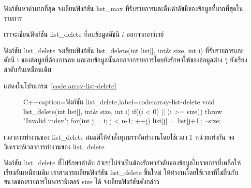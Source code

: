 \begin{quiz}{ฟังก์ชัน{\wbr}หา{\wbr}ค่า{\wbr}มาก{\wbr}ที่สุด}
จง{\wbr}เขียน{\wbr}ฟังก์ชัน {\ct list\_max} ที่{\wbr}รับ{\wbr}รายการ{\wbr}และ{\wbr}คืน{\wbr}ค่า{\wbr}ดัชนี{\wbr}ของ{\wbr}ข้อมูล{\wbr}ที่{\wbr}มาก{\wbr}ที่สุด{\wbr}ใน{\wbr}รายการ{\wbr}
\end{quiz}

เรา{\wbr}จะ{\wbr}เขียน{\wbr}ฟังก์ชัน {\ct list\_delete} ที่{\wbr}ลบ{\wbr}ข้อมูล{\wbr}ดัชนี $i$ ออก{\wbr}จาก{\wbr}อาร์เรย์  

\begin{quiz}{ฟังก์ชัน {\ct list\_delete}}
จง{\wbr}เขียน{\wbr}ฟังก์ชัน {\ct list\_delete(int list[], int\& size, int i)}
ที่{\wbr}รับ{\wbr}รายการ{\wbr}และ{\wbr}ดัชนี {\ct i} ของ{\wbr}ข้อมูล{\wbr}ที่{\wbr}ต้องการ{\wbr}ลบ{\wbr}
และ{\wbr}ลบ{\wbr}ข้อมูล{\wbr}นั้น{\wbr}ออก{\wbr}จาก{\wbr}รายการ{\wbr}โดย{\wbr}ยัง{\wbr}รักษา{\wbr}ให้{\wbr}ของ{\wbr}ข้อมูล{\wbr}ต่าง ๆ ยัง{\wbr}เรียงลำดับ{\wbr}กัน{\wbr}เหมือน{\wbr}เดิม{\wbr}
\end{quiz}
\begin{quizans}
แสดง{\wbr}ใน{\wbr}โปรแกรม~\ref{code:array-list-delete}
\end{quizans}

\begin{figure}
\latintext
\begin{codelist}{C++}{caption={\thaitext ฟังก์ชัน {\ct list\_delete}\latintext},label=code:array-list-delete}
void list_delete(int list[], int& size, int i)
{
  if((i < 0) || (i >= size))
    throw "Invalid index";
  for(int j = i; j < n-1; ++j)
    list[j] = list[j+1];
  --size;
}
\end{codelist}
\thaitext
\end{figure}

\begin{quiz}{เวลา{\wbr}การ{\wbr}ทำงาน{\wbr}ของ {\ct list\_delete}}
สมมติ{\wbr}ให้{\wbr}คำสั่ง{\wbr}ทุก{\wbr}บรรทัด{\wbr}ทำงาน{\wbr}โดย{\wbr}ใช้เวลา 1 หน่วย{\wbr}เท่า{\wbr}กัน จง{\wbr}วิเคราะห์{\wbr}เวลา{\wbr}การ{\wbr}ทำงาน{\wbr}ของ{\wbr}
{\ct list\_delete} 
\end{quiz}

\begin{quiz}{ฟังก์ชัน {\ct list\_delete} ที่{\wbr}ไม่{\wbr}รักษา{\wbr}ลำดับ}
ถ้า{\wbr}เรา{\wbr}ไม่{\wbr}จำเป็น{\wbr}ต้อง{\wbr}รักษา{\wbr}ลำดับ{\wbr}ของ{\wbr}ข้อมูล{\wbr}ใน{\wbr}รายการ{\wbr}ที่{\wbr}เหลือ{\wbr}ให้{\wbr}เรียง{\wbr}กัน{\wbr}เหมือน{\wbr}เดิม{\wbr}
เรา{\wbr}สามารถ{\wbr}เขียน{\wbr}ฟังก์ชัน {\ct list\_delete} ขึ้น{\wbr}ใหม่{\wbr}
ให้{\wbr}ทำงาน{\wbr}โดย{\wbr}ใช้เวลา{\wbr}ที่{\wbr}ไม่{\wbr}ขึ้น{\wbr}กับ{\wbr}ขนาด{\wbr}ของ{\wbr}รายการ{\wbr}ใน{\wbr}พารามิเตอร์ {\ct size} ได้{\wbr}
จง{\wbr}เขียน{\wbr}ฟังก์ชัน{\wbr}ดังกล่าว{\wbr}
\end{quiz}

